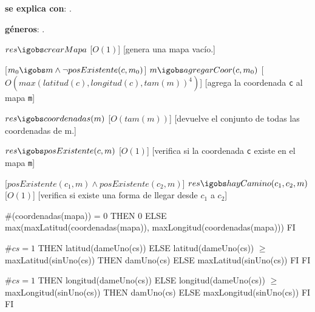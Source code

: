 \begin{Interfaz}


\textbf{se explica con}: .

\textbf{g\'eneros}: .



%
{$res \igobs crearMapa$}%
[$O(1)$]
[genera una mapa vac\'io.]


[$m_0 \igobs m \land \lnot posExistente(c, m_0) $]  
{$m \igobs agregarCoor(c, m_0)$}
[$O(  max(latitud(c), longitud(c), tam(m))^4  )$]
[agrega la coordenada \texttt{c} al mapa \texttt{m}]


%
{$res \igobs coordenadas(m)$}%
[$O(tam(m))$]  %
[devuelve el conjunto de todas las coordenadas de m.]


{$res \igobs posExistente(c, m)$}
[$O(1)$]
[verifica si la coordenada \texttt{c} existe en el mapa \texttt{m}]


[$posExistente(c_1, m) \land posExistente(c_2, m) $]
{$res \igobs hayCamino(c_1, c_2, m)$}
[$O(1)$]
[verifica si existe una forma de llegar desde \texttt{$c_1$} a \texttt{$c_2$}]


  
\begin{tad}{}



{
\IF
$\#$(coordenadas(mapa)) = 0
THEN
0
ELSE
max(maxLatitud(coordenadas(mapa)), maxLongitud(coordenadas(mapa)))
FI
}


{
\IF
$\#cs = 1$
THEN
latitud(dameUno(cs))
ELSE
{
\IF latitud(dameUno(cs)) $\geq$ maxLatitud(sinUno(cs))
THEN
damUno(cs)
ELSE
maxLatitud(sinUno(cs))
FI
}
FI}


{
\IF
$\#cs = 1$
THEN
longitud(dameUno(cs))
ELSE
{
\IF longitud(dameUno(cs)) $\geq$ maxLongitud(sinUno(cs))
THEN
damUno(cs)
ELSE
maxLongitud(sinUno(cs))
FI
}
FI}


\end{tad}



\end{Interfaz}


